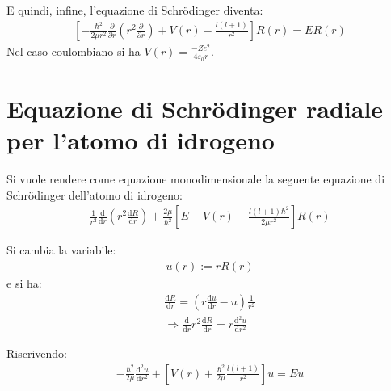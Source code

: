 E quindi, infine, l'equazione di Schrödinger diventa:
\begin{equation}\begin{split}
\left[-\frac{\hbar ^2}{2\mu r^2}\frac{\partial }{\partial r}\left(r^2\frac{\partial }{\partial r}\right)+V\left(r\right)-\frac{l\left(l+1\right)}{r^2}\right]R\left(r\right)=ER\left(r\right)
\end{split}\end{equation}
Nel caso coulombiano si ha $V\left(r\right)=\frac{-Ze^2}{4\varepsilon_0r}$.

\section[Equazione di Schrödinger radiale]{Equazione di Schrödinger radiale per l'atomo di idrogeno} %
Si vuole rendere come equazione monodimensionale la seguente equazione di Schrödinger dell'atomo di idrogeno:
\begin{equation}\begin{split}
\frac{1}{r^2}\frac{\textrm{d}}{\textrm{d}r}\left(r^2\frac{\textrm{d}R}{\textrm{d}r}\right)+\frac{2\mu}{\hbar ^2}\left[E-V\left(r\right)-\frac{l\left(l+1\right)\hbar ^2}{2\mu r^2}\right]R\left(r\right)
\end{split}\end{equation}

Si cambia la variabile:
\begin{equation}\begin{split}
u\left(r\right):=rR\left(r\right)
\end{split}\end{equation}
e si ha:
\begin{equation}\begin{split}
\frac{\textrm{d}R}{\textrm{d}r}=\left(r\frac{\textrm{d}u}{\textrm{d}r}-u\right)\frac{1}{r^2} \\
\Longrightarrow \frac{\textrm{d}}{\textrm{d}r}r^2\frac{\textrm{d}R}{\textrm{d}r}=r\frac{\textrm{d}^2u}{\textrm{d}r^2}
\end{split}\end{equation}

Riscrivendo:
\begin{equation}\begin{split}
-\frac{\hbar ^2}{2\mu}\frac{\textrm{d}^2u}{\textrm{d}r^2}+\left[V\left(r\right)+\frac{\hbar ^2}{2\mu}\frac{l\left(l+1\right)}{r^2}\right]u=Eu
\end{split}\end{equation}

